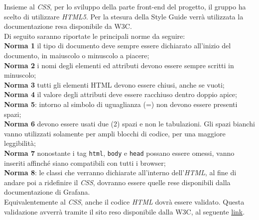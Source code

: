 Insieme al \textit{CSS}, per lo sviluppo della parte front-end del progetto, il gruppo ha scelto di utilizzare \textit{HTML5}. Per la stesura della Style Guide verrà utilizzata la documentazione resa disponibile da W3C.\\
Di seguito saranno riportate le principali norme da seguire: \\
	\textbf{Norma 1}
		il tipo di documento deve sempre essere dichiarato all'inizio del documento, in maiuscolo o minuscolo a piacere; \\
	\textbf{Norma 2}
		i nomi degli elementi ed attributi devono essere sempre scritti in minuscolo; \\
	\textbf{Norma 3}
		tutti gli elementi HTML devono essere chiusi, anche se vuoti; \\
	\textbf{Norma 4}
		il valore degli attributi deve essere racchiuso dentro doppio apice;\\
	\textbf{Norma 5}:
		intorno al simbolo di uguaglianza (=) non devono essere presenti spazi;\\
	\textbf{Norma 6}
		devono essere usati due (2) spazi e non le tabulazioni. Gli spazi bianchi vanno utilizzati solamente per ampli blocchi di codice, per una maggiore leggibilità; \\
	\textbf{Norma 7}
		nonostante i tag \texttt{html}, 	\texttt{body} e \texttt{head} possano essere omessi, vanno inseriti affinché siano compatibili con tutti i browser;\\
	\textbf{Norma 8}:
		le classi che verranno dichiarate all'interno dell'\textit{HTML}, al fine di andare poi a ridefinire il \textit{CSS}, dovranno essere quelle rese disponibili dalla documentazione di Grafana.	\\


Equivalentemente al \textit{CSS}, anche il codice \textit{HTML} dovrà essere validato. Questa validazione avverrà tramite il sito reso disponibile dalla W3C, al seguente \href{https://validator.w3.org/}{link}.


